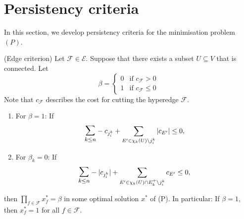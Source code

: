 \section{Persistency criteria}
In this section, we develop persistency criteria for the minimisation problem $(P)$.
\begin{theorem}{(Edge criterion)}
Let $\mathcal{F} \in \mathcal{E}$. Suppose that there exists a subset $U \subseteq V$ that is connected. Let
\[ \beta = \begin{cases}
0 & \text{if } c_{\mathcal{F}} >0  \\
1 & \text{if } c_{\mathcal{F}}  \leq 0 
\end{cases}\]
Note that $c_{\mathcal{F}}$ describes the cost for cutting the hyperedge $\mathcal{F}$. 
\begin{enumerate}
\item For $\beta=1$: If 
\begin{equation*}
 \mathlarger{\mathlarger{\sum}}_{k \leq n} - c_{j^k_i}+ \sum_{E' \in \chi_k(U) \setminus j^k_i} |c_{E'}| \leq 0,
\end{equation*}
\item For $\beta_k=0$: If
\begin{equation*}
 \mathlarger{\mathlarger{\sum}}_{k \leq n} - |c_{j^k_i}| +\sum_{E' \in \chi_k(U)\cap E^+_k \setminus j^k_i} c_{E'} \leq 0,  
\end{equation*}
\end{enumerate}
then $\prod_{f \in \mathcal{F}} x^*_f = \beta$ in some optimal solution $x^*$ of (P).
In particular: If $\beta=1$, then $x^*_f=1$ for all $f \in \mathcal{F}$.
\end{theorem}

